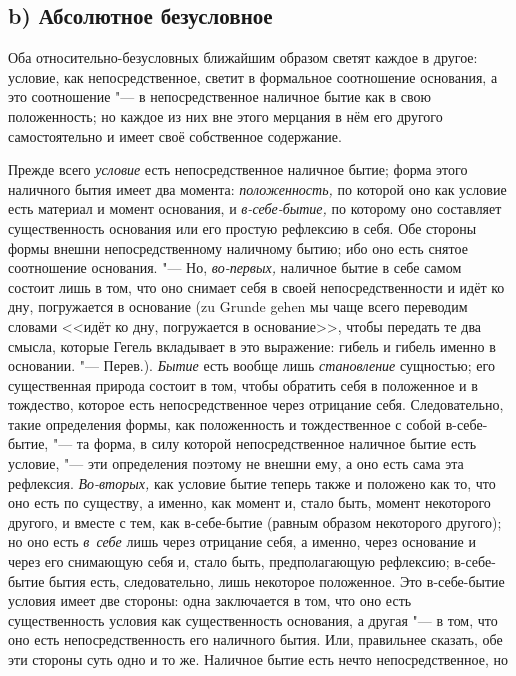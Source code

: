 \subsection[b) Абсолютное безусловное]{b) Абсолютное безусловное}

Оба относительно-безусловных ближайшим образом
светят каждое в другое: условие, как непосредственное, светит в формальное
соотношение основания, а это соотношение "--- в непосредственное наличное
бытие как в свою положенность; но каждое из них вне этого мерцания в нём
его другого самостоятельно и имеет своё собственное содержание.

Прежде всего {\em условие} есть непосредственное
наличное бытие; форма этого наличного бытия имеет два момента:
{\em положенность,} по которой оно как условие есть
материал и момент основания, и {\em в-себе-бытие,} по
которому оно составляет существенность основания или его простую рефлексию
в себя. Обе стороны формы внешни непосредственному наличному бытию; ибо оно
есть снятое соотношение основания. "--- Но,
{\em во-первых,} наличное бытие в себе самом состоит
лишь в том, что оно снимает себя в своей непосредственности и идёт ко дну,
погружается в основание (zu Grunde gehen мы чаще всего переводим словами
<<идёт ко дну, погружается в основание>>, чтобы передать те два смысла,
которые Гегель вкладывает в это выражение: гибель и гибель именно в
основании. "--- Перев.). {\em Бытие} есть вообще лишь
{\em становление} сущностью; его существенная природа
состоит в том, чтобы обратить себя в положенное и в тождество, которое есть
непосредственное через отрицание себя. Следовательно, такие определения
формы, как положенность и тождественное с собой в-себе-бытие, "--- та форма, в
силу которой непосредственное наличное бытие есть условие, "--- эти
определения поэтому не внешни ему, а оно есть сама эта рефлексия.
{\em Во-вторых,} как условие бытие теперь также и
положено как то, что оно есть по существу, а именно, как момент и, стало
быть, момент некоторого другого, и вместе с тем, как в-себе-бытие (равным
образом некоторого другого); но оно есть {\em в~себе}
лишь через отрицание себя, а именно, через основание и через его снимающую
себя и, стало быть, предполагающую рефлексию; в-себе-бытие бытия есть,
следовательно, лишь некоторое положенное. Это в-себе-бытие условия имеет
две стороны: одна заключается в том, что оно есть существенность условия
как существенность основания, а другая "--- в том, что оно есть
непосредственность его наличного бытия. Или, правильнее сказать, обе эти
стороны суть одно и то же. Наличное бытие есть нечто непосредственное, но
